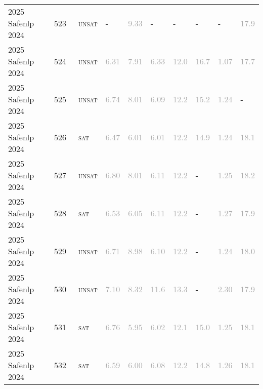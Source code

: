 \begin{center}
{\begin{longtable}{@{}llllllllll@{}}
2025 Safenlp 2024 & 523 & ~\textsc{unsat} & - & \textcolor{darkgray}{9.33} & - & - & - & - & \textcolor{darkgray}{17.9} \\
2025 Safenlp 2024 & 524 & ~\textsc{unsat} & \textcolor{darkgray}{6.31} & \textcolor{darkgray}{7.91} & \textcolor{darkgray}{6.33} & \textcolor{darkgray}{12.0} & \textcolor{darkgray}{16.7} & \textcolor{darkgray}{1.07} & \textcolor{darkgray}{17.7} \\
2025 Safenlp 2024 & 525 & ~\textsc{unsat} & \textcolor{darkgray}{6.74} & \textcolor{darkgray}{8.01} & \textcolor{darkgray}{6.09} & \textcolor{darkgray}{12.2} & \textcolor{darkgray}{15.2} & \textcolor{darkgray}{1.24} & - \\
2025 Safenlp 2024 & 526 & ~\textsc{sat} & \textcolor{darkgray}{6.47} & \textcolor{darkgray}{6.01} & \textcolor{darkgray}{6.01} & \textcolor{darkgray}{12.2} & \textcolor{darkgray}{14.9} & \textcolor{darkgray}{1.24} & \textcolor{darkgray}{18.1} \\
2025 Safenlp 2024 & 527 & ~\textsc{unsat} & \textcolor{darkgray}{6.80} & \textcolor{darkgray}{8.01} & \textcolor{darkgray}{6.11} & \textcolor{darkgray}{12.2} & - & \textcolor{darkgray}{1.25} & \textcolor{darkgray}{18.2} \\
2025 Safenlp 2024 & 528 & ~\textsc{sat} & \textcolor{darkgray}{6.53} & \textcolor{darkgray}{6.05} & \textcolor{darkgray}{6.11} & \textcolor{darkgray}{12.2} & - & \textcolor{darkgray}{1.27} & \textcolor{darkgray}{17.9} \\
2025 Safenlp 2024 & 529 & ~\textsc{unsat} & \textcolor{darkgray}{6.71} & \textcolor{darkgray}{8.98} & \textcolor{darkgray}{6.10} & \textcolor{darkgray}{12.2} & - & \textcolor{darkgray}{1.24} & \textcolor{darkgray}{18.0} \\
2025 Safenlp 2024 & 530 & ~\textsc{unsat} & \textcolor{darkgray}{7.10} & \textcolor{darkgray}{8.32} & \textcolor{darkgray}{11.6} & \textcolor{darkgray}{13.3} & - & \textcolor{darkgray}{2.30} & \textcolor{darkgray}{17.9} \\
2025 Safenlp 2024 & 531 & ~\textsc{sat} & \textcolor{darkgray}{6.76} & \textcolor{darkgray}{5.95} & \textcolor{darkgray}{6.02} & \textcolor{darkgray}{12.1} & \textcolor{darkgray}{15.0} & \textcolor{darkgray}{1.25} & \textcolor{darkgray}{18.1} \\
2025 Safenlp 2024 & 532 & ~\textsc{sat} & \textcolor{darkgray}{6.59} & \textcolor{darkgray}{6.00} & \textcolor{darkgray}{6.08} & \textcolor{darkgray}{12.2} & \textcolor{darkgray}{14.8} & \textcolor{darkgray}{1.26} & \textcolor{darkgray}{18.1} \\

\end{longtable}}
\end{center}
